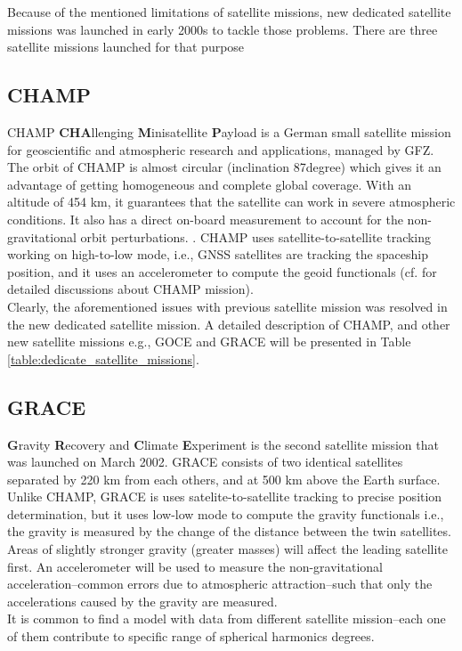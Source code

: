  Because of the mentioned limitations of satellite missions, new dedicated satellite missions was launched in early 2000s to tackle those problems. There are three satellite missions launched for that purpose
 \subsection{CHAMP}
 {CHAMP} \textbf{CHA}llenging \textbf{M}inisatellite \textbf{P}ayload is a German small satellite mission for geoscientific and atmospheric research and applications, managed by GFZ. The orbit of CHAMP is almost circular (inclination 87\si{degree}) which gives it an advantage of getting homogeneous and complete global coverage. With an altitude of 454 km, it guarantees that the satellite can work in severe atmospheric conditions. It also has a direct on-board measurement to account for the non-gravitational orbit perturbations. . CHAMP uses satellite-to-satellite tracking working on high-to-low mode, i.e., GNSS satellites are tracking the spaceship position, and it uses an accelerometer to compute the geoid functionals (cf. \cite{luhr} for detailed discussions about CHAMP mission). 
 \\
 Clearly, the aforementioned issues with previous satellite mission was resolved in the new dedicated satellite mission. A detailed description of CHAMP, and other new satellite missions e.g., GOCE and GRACE will be presented in Table \ref{table:dedicate_satellite_missions}. 
 
 \subsection{GRACE}
 \textbf{G}ravity \textbf{R}ecovery and \textbf{C}limate \textbf{E}xperiment is the second satellite mission that was launched on March 2002. GRACE consists of two identical satellites separated by 220 km from each others, and at 500 km above the Earth surface. Unlike CHAMP, GRACE is uses satelite-to-satellite tracking to precise position determination, but it uses low-low mode to compute the gravity functionals i.e., the gravity is measured by the change of the distance between the twin satellites. Areas of slightly stronger gravity (greater masses) will affect the leading satellite first. An accelerometer will be used to measure the non-gravitational acceleration--common errors due to atmospheric attraction--such that only the accelerations caused by the gravity are measured. 
 \\
 It is common to find a model with data from different satellite mission--each one of them contribute to specific range of spherical harmonics degrees.
 
